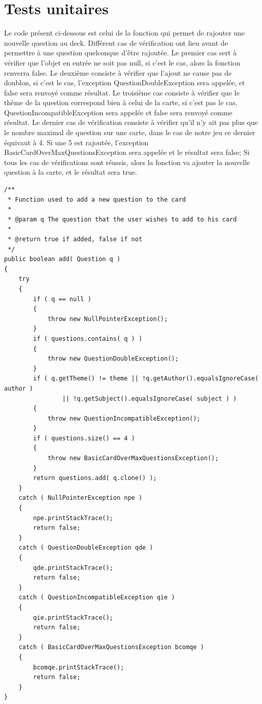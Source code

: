 \newpage
\section{Tests unitaires}

Le code présent ci-dessous est celui de la fonction qui permet de rajouter une nouvelle question au deck.
Différent cas de vérification ont lieu avant de permettre à une question quelconque d'être rajoutée.
Le premier cas sert à vérifier que l'objet en entrée ne soit pas null, si c'est le cas, alors la fonction renverra false.
Le deuxième consiste à vérifier que l'ajout ne cause pas de doublon, si c'est le cas, l'exception QuestionDoubleException sera appelée, et false sera renvoyé comme résultat.
Le troisième cas consiste à vérifier que le thème de la question correspond bien à celui de la carte, si c'est pas le cas, QuestionIncompatibleException sera appelée et false sera renvoyé comme résultat.
Le dernier cas de vérification consiste à vérifier qu'il n'y ait pas plus que le nombre maximal de question sur une carte, dans le cas de notre jeu ce dernier équivaut à 4.
Si une 5 est rajoutée, l'exception BasicCardOverMaxQuestionsException sera appelée et le résultat sera false;
Si tous les cas de vérifications sont réussis, alors la fonction va ajouter la nouvelle question à la carte, et le résultat sera true.

\begin{lstlisting}
/**
 * Function used to add a new question to the card
 * 
 * @param q The question that the user wishes to add to his card
 * 
 * @return true if added, false if not
 */
public boolean add( Question q )
{
    try
    {
        if ( q == null )
        {
            throw new NullPointerException();
        }
        if ( questions.contains( q ) )
        {
            throw new QuestionDoubleException();
        }
        if ( q.getTheme() != theme || !q.getAuthor().equalsIgnoreCase( author )
                || !q.getSubject().equalsIgnoreCase( subject ) )
        {
            throw new QuestionIncompatibleException();
        }
        if ( questions.size() == 4 )
        {
            throw new BasicCardOverMaxQuestionsException();
        }
        return questions.add( q.clone() );
    }
    catch ( NullPointerException npe )
    {
        npe.printStackTrace();
        return false;
    }
    catch ( QuestionDoubleException qde )
    {
        qde.printStackTrace();
        return false;
    }
    catch ( QuestionIncompatibleException qie )
    {
        qie.printStackTrace();
        return false;
    }
    catch ( BasicCardOverMaxQuestionsException bcomqe )
    {
        bcomqe.printStackTrace();
        return false;
    }
}
\end{lstlisting}


